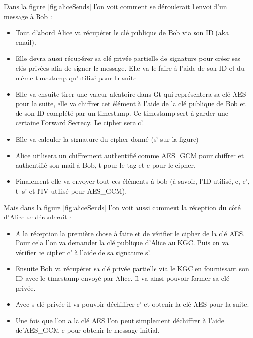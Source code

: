 Dans la figure \ref{fig:aliceSends} l'on voit comment se déroulerait l'envoi d'un message à Bob : 
\begin{itemize}
	\item Tout d'abord Alice va récupérer le clé publique de Bob via son ID (aka email).
	\item Elle devra aussi récupérer sa clé privée partielle de signature pour créer ses clés privées afin de signer le message. Elle va le faire à l'aide de son ID et du même timestamp qu'utilisé pour la suite.
	\item Elle va ensuite tirer une valeur aléatoire dans Gt qui représentera sa clé AES pour la suite, elle va chiffrer cet élément à l'aide de la clé publique de Bob et de son ID complété par un timestamp. Ce timestamp sert à garder une certaine Forward Secrecy. Le cipher sera c'.
	\item Elle va calculer la signature du cipher donné (s' sur la figure)
	\item Alice utilisera un chiffrement authentifié comme AES\_GCM pour chiffrer et authentifié son mail à Bob, t pour le tag et c pour le cipher.
	\item Finalement elle va envoyer tout ces éléments à bob (à savoir, l'ID utilisé, c, c', t, s' et l'IV utilisé pour AES\_GCM).
\end{itemize}
Mais dans la figure \ref{fig:aliceSends} l'on voit aussi comment la réception du côté d'Alice se déroulerait :
\begin{itemize}
	\item A la réception la première chose à faire et de vérifier le cipher de la clé AES. Pour cela l'on va demander la clé publique d'Alice au KGC. Puis on va vérifier ce cipher c' à l'aide de sa signature s'.
	\item Ensuite Bob va récupérer sa clé privée partielle via le KGC en fournissant son ID avec le timestamp envoyé par Alice. Il va ainsi pouvoir former sa clé privée.
	\item Avec s clé privée il va pouvoir déchiffrer c' et obtenir la clé AES pour la suite.
	\item Une fois que l'on a la clé AES l'on peut simplement déchiffrer à l'aide de'AES\_GCM c pour obtenir le message initial.
\end{itemize}
